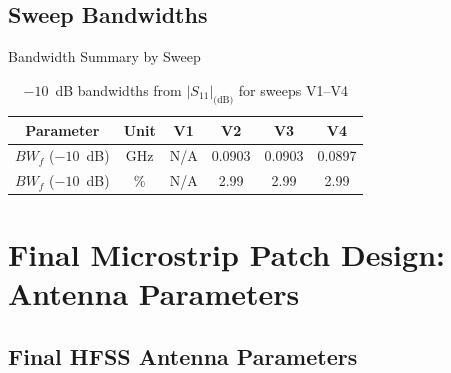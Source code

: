 \documentclass[compress,aspectratio=169,10pt]{beamer}
\begin{document}
\subsection[Sweeps]{Sweep Bandwidths}

\begin{frame}{Bandwidth Summary by Sweep}
    \begin{table}
        \centering
        \begin{tabular}{|c|c|c|c|c|c|}
            \hline
            \textbf{Parameter} & \textbf{Unit} & \textbf{V1} & \textbf{V2} & \textbf{V3} & \textbf{V4} \\
            \hline
            $BW_f$ ($-10$~dB) & GHz & N/A & 0.0903 & 0.0903 & 0.0897 \\
            \hline
            $BW_f$ ($-10$~dB) & \% & N/A & 2.99 & 2.99 & 2.99 \\
            \hline
        \end{tabular}
        \caption{$-10$~dB bandwidths from $|S_{11}|_\text{(dB)}$ for sweeps V1--V4}
        \label{tab:bandwidth-sweeps}
    \end{table}
\end{frame}


\section[Final Design]{Final Microstrip Patch Design: Antenna Parameters}

\subsection[HFSS Params]{Final HFSS Antenna Parameters}
\end{document}
